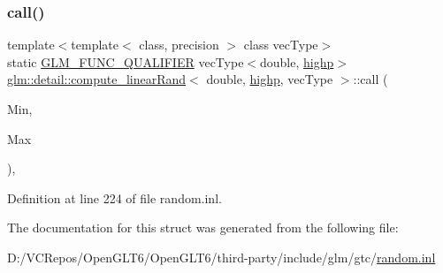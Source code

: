 \subsubsection{\texorpdfstring{call()}{call()}}
{\footnotesize\ttfamily template$<$template$<$ class, precision $>$ class vec\+Type$>$ \\
static \mbox{\hyperlink{setup_8hpp_a33fdea6f91c5f834105f7415e2a64407}{G\+L\+M\+\_\+\+F\+U\+N\+C\+\_\+\+Q\+U\+A\+L\+I\+F\+I\+ER}} vec\+Type$<$double, \mbox{\hyperlink{namespaceglm_a0f04f086094c747d227af4425893f545ac6f7eab42eacbb10d59a58e95e362074}{highp}}$>$ \mbox{\hyperlink{structglm_1_1detail_1_1compute__linear_rand}{glm\+::detail\+::compute\+\_\+linear\+Rand}}$<$ double, \mbox{\hyperlink{namespaceglm_a0f04f086094c747d227af4425893f545ac6f7eab42eacbb10d59a58e95e362074}{highp}}, vec\+Type $>$\+::call (\begin{DoxyParamCaption}\item[{vec\+Type$<$ double, \mbox{\hyperlink{namespaceglm_a0f04f086094c747d227af4425893f545ac6f7eab42eacbb10d59a58e95e362074}{highp}} $>$ const \&}]{Min,  }\item[{vec\+Type$<$ double, \mbox{\hyperlink{namespaceglm_a0f04f086094c747d227af4425893f545ac6f7eab42eacbb10d59a58e95e362074}{highp}} $>$ const \&}]{Max }\end{DoxyParamCaption})\hspace{0.3cm}{\ttfamily [inline]}, {\ttfamily [static]}}



Definition at line 224 of file random.\+inl.



The documentation for this struct was generated from the following file\+:\begin{DoxyCompactItemize}
\item 
D\+:/\+V\+C\+Repos/\+Open\+G\+L\+T6/\+Open\+G\+L\+T6/third-\/party/include/glm/gtc/\mbox{\hyperlink{random_8inl}{random.\+inl}}\end{DoxyCompactItemize}

